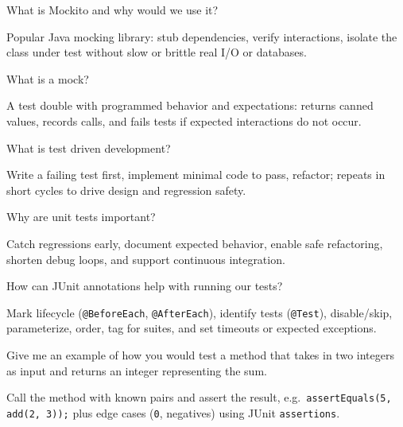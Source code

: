 



\question[4]
What is Mockito and why would we use it?
\makeemptybox{1.25in}
\begin{solution}
  Popular Java mocking library: stub dependencies, verify interactions, isolate the class under test without slow or brittle real I/O or databases.
\end{solution}

\question[4]
What is a mock?
\makeemptybox{1.05in}
\begin{solution}
  A test double with programmed behavior and expectations: returns canned values, records calls, and fails tests if expected interactions do not occur.
\end{solution}

\question[4]
What is test driven development?
\makeemptybox{1.2in}
\begin{solution}
  Write a failing test first, implement minimal code to pass, refactor; repeats in short cycles to drive design and regression safety.
\end{solution}

\question[4]
Why are unit tests important?
\makeemptybox{1.25in}
\begin{solution}
  Catch regressions early, document expected behavior, enable safe refactoring, shorten debug loops, and support continuous integration.
\end{solution}

\question[4]
How can JUnit annotations help with running our tests?
\makeemptybox{1.35in}
\begin{solution}
  Mark lifecycle (\texttt{@BeforeEach}, \texttt{@AfterEach}), identify tests (\texttt{@Test}), disable/skip, parameterize, order, tag for suites, and set timeouts or expected exceptions.
\end{solution}

\question[4]
Give me an example of how you would test a method that takes in two integers as input and returns an integer representing the sum.
\makeemptybox{1.55in}
\begin{solution}
  Call the method with known pairs and assert the result, e.g.\ \texttt{assertEquals(5, add(2, 3));} plus edge cases (\texttt{0}, negatives) using JUnit \texttt{assertions}.
\end{solution}


